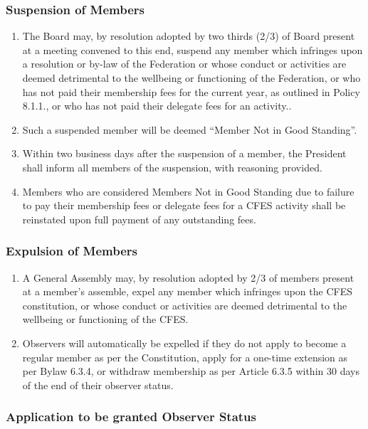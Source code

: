 \subsubsection{Suspension of Members}
\label{suspension-of-members}

\begin{enumerate}
 \item
  The Board may, by resolution adopted by two thirds (2/3) of Board present at a meeting convened to this end, suspend any member which infringes upon a resolution or by-law of the Federation or whose conduct or activities are deemed detrimental to the wellbeing or functioning of the Federation, or who has not paid their membership fees for the current year, as outlined in Policy 8.1.1., or who has not paid their delegate fees for an activity..
 \item
  Such a suspended member will be deemed “Member Not in Good Standing”.
 \item
  Within two business days after the suspension of a member, the President shall inform all members of the suspension, with reasoning provided.
 \item
  Members who are considered Members Not in Good Standing due to failure to pay their membership fees or delegate fees for a CFES activity shall be reinstated upon full payment of any outstanding fees.
\end{enumerate}

\subsubsection{Expulsion of Members}
\label{expulsion-of-members}

\begin{enumerate}
 \item
  A General Assembly may, by resolution adopted by 2/3 of members present at a member's assemble, expel any member which infringes upon the CFES constitution, or whose conduct or activities are deemed detrimental to the wellbeing or functioning of the CFES.
 \item
  Observers will automatically be expelled if they do not apply to become a regular member as per the Constitution, apply for a one-time extension as per Bylaw 6.3.4, or withdraw membership as per Article 6.3.5 within 30 days of the end of their observer status.
\end{enumerate}

\subsubsection{Application to be granted Observer Status}
\label{application-to-be-granted-observer-status}


